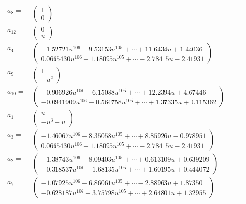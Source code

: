 \documentclass[1p]{elsarticle_modified}
\theoremstyle{definition}
\begin{document}
\begin{tabular}{m{7pt} m{180pt} m{7pt} m{180pt} }
\flushright $a_{8}=$&$\begin{pmatrix}1\\0\end{pmatrix}$ \\
\flushright $a_{12}=$&$\begin{pmatrix}0\\u\end{pmatrix}$ \\
\flushright $a_{4}=$&$\begin{pmatrix}-1.52721 u^{106}-9.53153 u^{105}+\cdots+11.6434 u+1.44036\\0.0665430 u^{106}+1.18095 u^{105}+\cdots-2.78415 u-2.41931\end{pmatrix}$ \\
\flushright $a_{9}=$&$\begin{pmatrix}1\\- u^2\end{pmatrix}$ \\
\flushright $a_{10}=$&$\begin{pmatrix}-0.906926 u^{106}-6.15088 u^{105}+\cdots+12.2394 u+4.67446\\-0.0941909 u^{106}-0.564758 u^{105}+\cdots+1.37335 u+0.115362\end{pmatrix}$ \\
\flushright $a_{1}=$&$\begin{pmatrix}u\\- u^3+u\end{pmatrix}$ \\
\flushright $a_{3}=$&$\begin{pmatrix}-1.46067 u^{106}-8.35058 u^{105}+\cdots+8.85926 u-0.978951\\0.0665430 u^{106}+1.18095 u^{105}+\cdots-2.78415 u-2.41931\end{pmatrix}$ \\
\flushright $a_{2}=$&$\begin{pmatrix}-1.38743 u^{106}-8.09403 u^{105}+\cdots+0.613109 u+0.639209\\-0.318537 u^{106}-1.68135 u^{105}+\cdots+1.60195 u+0.444072\end{pmatrix}$ \\
\flushright $a_{7}=$&$\begin{pmatrix}-1.07925 u^{106}-6.86061 u^{105}+\cdots-2.88963 u+1.87350\\-0.628187 u^{106}-3.75798 u^{105}+\cdots+2.64801 u+1.32955\end{pmatrix}$ \\

\end{tabular}
\end{document}
